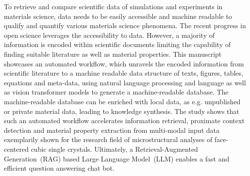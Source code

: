 To retrieve and compare scientific data of simulations and experiments in materials science, data needs to be easily accessible and machine readable to qualify and quantify various materials science phenomena.
The recent progress in open science leverages the accessibility to data. However, a majority of information is encoded within scientific documents limiting the capability of finding suitable literature as well as material properties.
This manuscript showcases an automated workflow, which unravels the encoded information from scientific literature to a machine readable data structure of texts, figures, tables, equations and meta-data, using natural language processing and language as well as vision transformer models to generate a machine-readable database.
The machine-readable database can be enriched with local data, as e.g. unpublished or private material data, leading to knowledge synthesis.
The study shows that such an automated workflow accelerates information retrieval, proximate context detection and material property extraction from multi-modal input data exemplarily shown for the research field of microstructural analyses of face-centered cubic single crystals.
Ultimately, a Retrieval-Augmented Generation~(RAG) based Large Language Model~(LLM) enables a fast and efficient question answering chat bot.
%